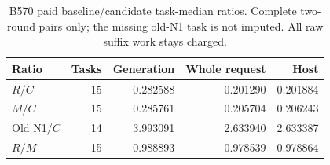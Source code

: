 \begin{table}[ht]\centering\small
\caption{B570 paid baseline/candidate task-median ratios. Complete two-round pairs only; the missing old-N1 task is not imputed. All raw suffix work stays charged.}\label{tab:b570_cost}
\begin{tabular}{@{}lrrrr@{}}\toprule
Ratio & Tasks & Generation & Whole request & Host\\\midrule
$R/C$ & 15 & 0.282588 & 0.201290 & 0.201884\\
$M/C$ & 15 & 0.285761 & 0.205704 & 0.206243\\
Old N1/$C$ & 14 & 3.993091 & 2.633940 & 2.633387\\
$R/M$ & 15 & 0.988893 & 0.978539 & 0.978864\\
\bottomrule\end{tabular}

\end{table}
